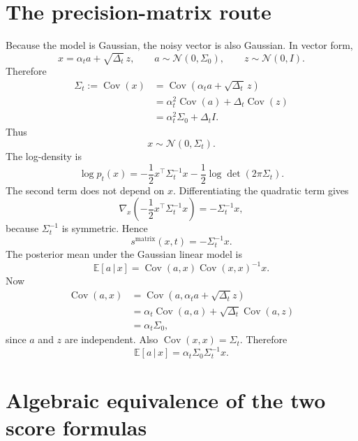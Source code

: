 \documentclass[11pt]{article}
\newcommand{\E}{\mathbb{E}}
\newcommand{\N}{\mathcal{N}}
\newcommand{\Cov}{\operatorname{Cov}}
\newcommand{\given}{\,|\,}
\begin{document}
\section{The precision-matrix route}

Because the model is Gaussian, the noisy vector is also Gaussian. In vector form,
\begin{equation}
  x=\alpha_t a+\sqrt{\Delta_t}\,z,
  \qquad
  a\sim\N(0,\Sigma_0),
  \qquad
  z\sim\N(0,I).
\end{equation}
Therefore
\begin{align}
  \Sigma_t
  :=\Cov(x)
  &=\Cov(\alpha_t a+\sqrt{\Delta_t}\,z) \\
  &=\alpha_t^2\Cov(a)+\Delta_t\Cov(z) \\
  &=\alpha_t^2\Sigma_0+\Delta_t I.
\end{align}
Thus
\begin{equation}
  x\sim\N(0,\Sigma_t).
\end{equation}
The log-density is
\begin{equation}
  \log p_t(x)
  =-\frac12x^\top\Sigma_t^{-1}x
  -\frac12\log\det(2\pi\Sigma_t).
\end{equation}
The second term does not depend on \(x\). Differentiating the quadratic term gives
\begin{equation}
  \nabla_x\left(-\frac12x^\top\Sigma_t^{-1}x\right)
  =-\Sigma_t^{-1}x,
\end{equation}
because \(\Sigma_t^{-1}\) is symmetric. Hence
\begin{equation}
  \boxed{
  s^{\mathrm{matrix}}(x,t)=-\Sigma_t^{-1}x.
  }
\end{equation}
The posterior mean under the Gaussian linear model is
\begin{equation}
  \E[a\given x]
  =\Cov(a,x)\Cov(x,x)^{-1}x.
\end{equation}
Now
\begin{align}
  \Cov(a,x)
  &=\Cov(a,\alpha_t a+\sqrt{\Delta_t}z) \\
  &=\alpha_t\Cov(a,a)+\sqrt{\Delta_t}\Cov(a,z) \\
  &=\alpha_t\Sigma_0,
\end{align}
since \(a\) and \(z\) are independent. Also \(\Cov(x,x)=\Sigma_t\). Therefore
\begin{equation}
  \boxed{
  \E[a\given x]=\alpha_t\Sigma_0\Sigma_t^{-1}x.
  }
\end{equation}

\section{Algebraic equivalence of the two score formulas}
\end{document}
